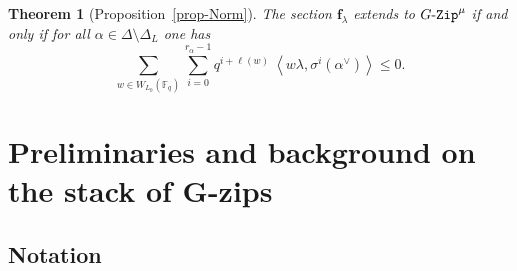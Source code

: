 \documentclass[10pt,a4paper]{article}
\numberwithin{equation}{section}
\newtheorem{thmIntro}{Theorem}
\theoremstyle{definition}
\theoremstyle{remark}
\newcommand{\GZip}{\mathop{\text{$G$-{\tt Zip}}}\nolimits}
\newcommand{\FF}{\mathbb{F}}
\begin{document}
\begin{thmIntro}[Proposition~\ref{prop-Norm}]\label{thm4}
The section $\mathbf{f}_\lambda$ extends to $\GZip^\mu$ if and only if for all $\alpha \in \Delta\setminus \Delta_L$ one has
\begin{equation}\label{formula-norm-intro}
\sum_{w\in W_{L_0}(\FF_q)} \sum_{i=0}^{r_\alpha-1} q^{i+\ell(w)} \ \left\langle w\lambda, \sigma^i\left(\alpha^\vee\right) \right\rangle\leq 0. \tag{1}
\end{equation}
\end{thmIntro}

\section{Preliminaries and background on the stack of \texorpdfstring{$\boldsymbol{G}$}{G}-zips}\label{sec2}

\subsection{Notation}\label{subsec-notation}
\end{document}
